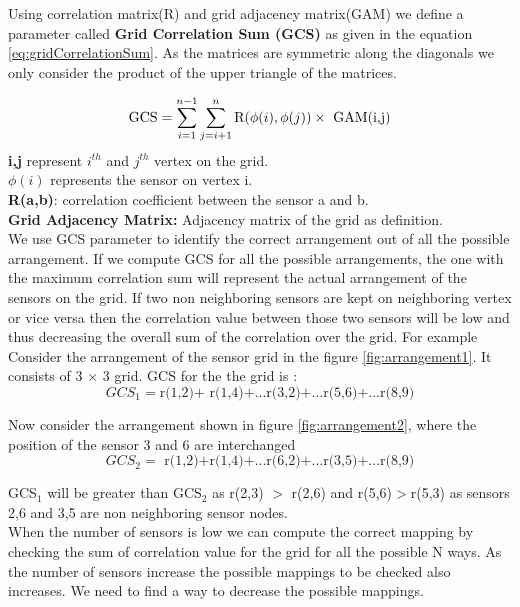 Using correlation matrix(R) and grid adjacency matrix(GAM) we define a parameter called \textbf{Grid Correlation Sum (GCS)} as given in the equation \ref{eq:gridCorrelationSum}. 
As the matrices are symmetric along the diagonals we only consider the product of the upper triangle of the matrices.

\begin{equation}
\centering
\text{GCS}=\sum_{i=1}^{n-1}\sum_{j=i+1}^{n}\text{R}(\phi(i),\phi(j))  \times \text{ GAM(i,j)}
\label{eq:gridCorrelationSum}
\end{equation}
\textbf{i,j} represent $ i^{th}$ and $ j^{th}$ vertex on the grid.\\
\textbf{$\phi(i)$} represents the sensor on vertex i.\\
\textbf{R(a,b)}: correlation coefficient between the sensor a and b.\\
\textbf{Grid Adjacency Matrix:}  Adjacency matrix of the grid as definition.\\

We use GCS parameter to identify the correct arrangement out of all the possible arrangement. If we compute  GCS for all the possible arrangements, the one with the maximum correlation sum will represent the actual arrangement of the sensors on the grid.  
If two non neighboring sensors are kept on neighboring vertex or vice versa then the correlation value between those two sensors will be low and thus decreasing the overall sum of the correlation over the grid.
For example Consider the arrangement of the sensor grid in the figure \ref{fig:arrangement1}.
 It consists of 3 $\times$ 3 grid.  
GCS for the  the grid is :\\
\begin{equation*}
GCS_{1}=\text{r(1,2)+ r(1,4)+...r(3,2)+...r(5,6)+...r(8,9)}
\end{equation*}

Now consider the arrangement shown in figure \ref{fig:arrangement2}, where the position of the sensor 3 and 6 are interchanged\\
\begin{equation*}
GCS_{2}=\text{ r(1,2)+r(1,4)+...r(6,2)+...r(3,5)+...r(8,9)}
\end{equation*}

GCS$_{1}$ will be greater than GCS$_{2}$ as r(2,3) $>$ r(2,6) and r(5,6)$>$r(5,3) as sensors 2,6 and 3,5 are non neighboring sensor nodes.\\
When the number of sensors is low we can compute the correct mapping by checking the sum of correlation value for the grid for all the possible N ways. As the number of sensors increase the possible mappings to be checked also increases. We need to find a way to decrease the possible mappings.

